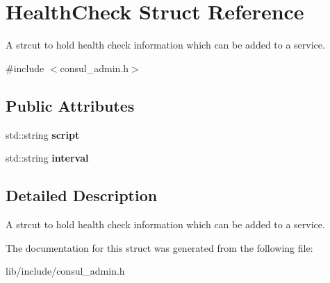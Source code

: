 \hypertarget{structHealthCheck}{\section{Health\-Check Struct Reference}
\label{structHealthCheck}
}


A strcut to hold health check information which can be added to a service.  




{\ttfamily \#include $<$consul\-\_\-admin.\-h$>$}

\subsection*{Public Attributes}
\begin{DoxyCompactItemize}
\item 
\hypertarget{structHealthCheck_af2cf9613abcc567941f8a21cd8c15bff}{std\-::string {\bfseries script}}\label{structHealthCheck_af2cf9613abcc567941f8a21cd8c15bff}

\item 
\hypertarget{structHealthCheck_af8e93405495e1733ba69a7e3f73a139a}{std\-::string {\bfseries interval}}\label{structHealthCheck_af8e93405495e1733ba69a7e3f73a139a}

\end{DoxyCompactItemize}


\subsection{Detailed Description}
A strcut to hold health check information which can be added to a service. 

The documentation for this struct was generated from the following file\-:\begin{DoxyCompactItemize}
\item 
lib/include/consul\-\_\-admin.\-h\end{DoxyCompactItemize}
